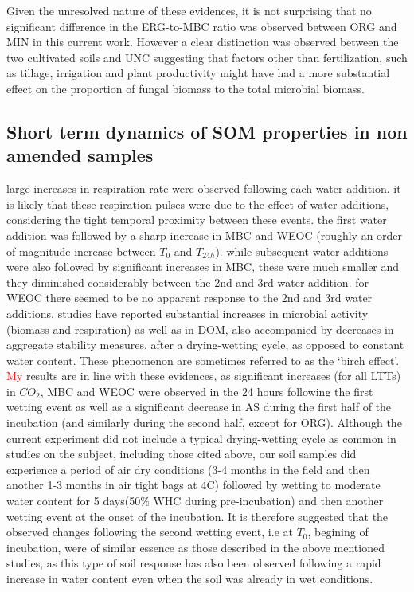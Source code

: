 \documentclass[12pt]{report}
\newcommand{\myRed}[1]{\textcolor{red}{#1}} %
\begin{document}
Given the unresolved nature of these evidences, it is not surprising that no significant difference in the ERG-to-MBC ratio was observed between ORG and MIN in this current work. However a clear distinction was observed between the two cultivated soils and UNC suggesting that factors other than fertilization, such as tillage, irrigation and plant productivity might have had a more substantial effect on the proportion of fungal biomass to the total microbial biomass. 

\subsection{Short term dynamics of SOM properties in non amended samples}\hypertarget{subsection_4.2.2}{}

large increases in respiration rate were observed following each water addition. it is likely that these respiration pulses were due to the effect of water additions, considering the tight temporal proximity between these events. the first water addition was followed by a sharp increase in MBC and WEOC (roughly an order of magnitude increase between $ T_0 $ and $ T_{24h} $). while subsequent water additions were also followed by significant increases in MBC, these were much smaller and they diminished considerably between the 2nd and 3rd water addition. for WEOC there seemed to be no apparent response to the 2nd and 3rd water additions. 
studies have reported substantial increases in microbial activity (biomass and respiration) as well as in DOM\citep{fierer2003}, also accompanied by decreases in aggregate stability measures\citep{cosentino2006}, after a drying-wetting cycle, as opposed to constant water content. These phenomenon are sometimes referred to as the ‘birch effect’.  \myRed{My} results are in line with these evidences, as significant increases (for all LTTs) in  $CO_2 $, MBC and WEOC  were observed in the 24 hours following the first wetting event as well as a significant decrease in AS during the first half of the incubation (and similarly during the second half, except for ORG). Although the current experiment did not include a typical drying-wetting cycle as common in  studies on the subject, including those cited above, our soil samples did experience a period of air dry conditions (3-4 months in the field  and then another 1-3 months in air tight bags at 4C) followed by wetting to moderate water content for 5 days(50\% WHC during pre-incubation) and then another wetting event at the onset of the incubation. It is therefore suggested that the observed changes following the second wetting event, i.e at $ T_0$, begining of incubation, were of similar essence as those described in the above mentioned studies, as this type of soil response has also been observed following a rapid increase in water content even when the soil was already in wet conditions\citep{xiang2008, rey2005}. 
\end{document}
